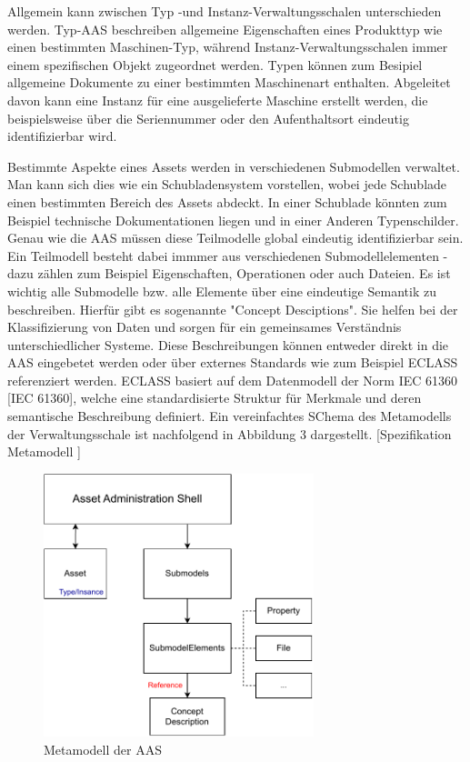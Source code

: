 Allgemein kann zwischen Typ -und Instanz-Verwaltungsschalen unterschieden werden.
Typ-AAS beschreiben allgemeine Eigenschaften eines Produkttyp wie einen bestimmten Maschinen-Typ, während Instanz-Verwaltungsschalen immer einem spezifischen Objekt zugeordnet werden.
Typen können zum Besipiel allgemeine Dokumente zu einer bestimmten Maschinenart enthalten.
Abgeleitet davon kann eine Instanz für eine ausgelieferte Maschine erstellt werden, die beispielsweise über die Seriennummer oder den Aufenthaltsort eindeutig identifizierbar wird.

Bestimmte Aspekte eines Assets werden in verschiedenen Submodellen verwaltet.
Man kann sich dies wie ein Schubladensystem vorstellen, wobei jede Schublade einen bestimmten Bereich des Assets abdeckt.
In einer Schublade könnten zum Beispiel technische Dokumentationen liegen und in einer Anderen Typenschilder. 
Genau wie die AAS müssen diese Teilmodelle global eindeutig identifizierbar sein.
Ein Teilmodell besteht dabei immmer aus verschiedenen Submodellelementen - dazu zählen zum Beispiel Eigenschaften, Operationen oder auch Dateien.
Es ist wichtig alle Submodelle bzw. alle Elemente über eine eindeutige Semantik zu beschreiben.
Hierfür gibt es sogenannte "Concept Desciptions".
Sie helfen bei der Klassifizierung von Daten und sorgen für ein gemeinsames Verständnis unterschiedlicher Systeme.
Diese Beschreibungen können entweder direkt in die AAS eingebetet werden oder über externes Standards wie zum Beispiel ECLASS referenziert werden.
ECLASS basiert auf dem Datenmodell der Norm IEC 61360 [IEC 61360], welche eine standardisierte Struktur für Merkmale und deren semantische Beschreibung definiert.
Ein vereinfachtes SChema des Metamodells der Verwaltungsschale ist nachfolgend in Abbildung 3 dargestellt.  [Spezifikation Metamodell
]

\begin{figure}[htbp]
    \centering
    \includegraphics[width=0.7\textwidth]{Bilder/Metamodel.pdf}
    \caption{Metamodell der AAS}
    \label{fig:klassifizierungDT}
\end{figure}

